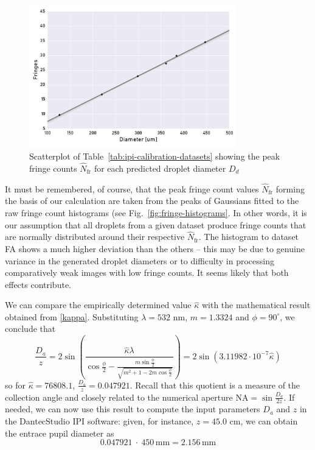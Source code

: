\documentclass[11.5pt]{book}
\newcommand*{\figref}[1]{Fig.~\ref{#1}}
\newcommand*{\tableref}[1]{Table~\ref{#1}}
\begin{document}
\begin{figure}[ht!]
    \centering
    \includegraphics[width=0.8\textwidth]{img/fringe_regression.pdf}
    \caption{Scatterplot of \tableref{tab:ipi-calibration-datasets} showing the peak fringe counts $\hat{N}_\text{fr}$ for each predicted droplet diameter $D_d$}
    \label{fig:fringe-regression}
\end{figure}
It must be remembered, of course, that the peak fringe count values
$\hat{N}_\text{fr}$ forming the basis of our calculation are taken from the
peaks of Gaussians fitted to the raw fringe count histograms (see
\figref{fig:fringe-histograms}. In other words, it is our assumption that all
droplets from a given dataset produce fringe counts that are normally
distributed around their respective $\hat{N}_\text{fr}$. The histogram to
dataset FA shows a much higher deviation than the others -- this may be due to
genuine variance in the generated droplet diameters or to difficulty in
processing comparatively weak images with low fringe counts. It seems likely
that both effects contribute.

We can compare the empirically determined value $\hat{\kappa}$ with the
mathematical result obtained from \eqref{kappa}. Substituting $\lambda = 532$
nm, $m = 1.3324$ and $\phi = 90^\circ$, we conclude that
\begin{equation}
    \frac{D_a}{z} = 2 \sin \left( \frac{\hat{\kappa} \lambda}{\cos
    \frac{\phi}{2} - \frac{ m \sin \frac{\phi}{2}}{\sqrt{m^2 + 1 - 2m \cos
    \frac{\phi}{2}}}} \right) = 2\sin (3.11982 \cdot 10^{-7} \hat{\kappa})
\end{equation}
so for $\hat{\kappa} = 76808.1$, $\frac{D_a}{z} = 0.047921$. Recall that this
quotient is a measure of the collection angle and closely related to the
numerical aperture NA$=\sin \frac{D_a}{2z}$. If needed, we can now use this
result to compute the input parameters $D_a$ and $z$ in the DantecStudio IPI
software: given, for instance, $z = 45.0$ cm, we can obtain the entrace pupil
diameter as
\begin{equation}
    0.047921~\cdot~450\,\mathrm{mm} = 2.156\,\mathrm{mm}
\end{equation}
\end{document}
